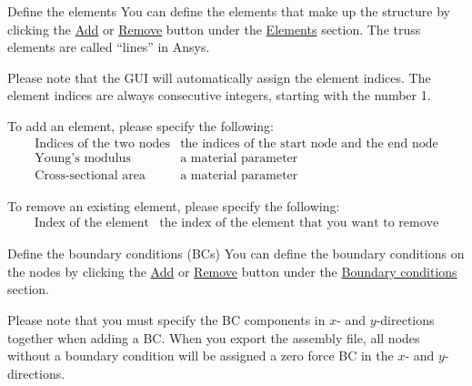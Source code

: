 \documentclass[oneside, english, reqno]{amsart}
\makeatletter
\theoremstyle{plain}
\theoremstyle{plain}
\theoremstyle{plain}
\theoremstyle{plain}
\theoremstyle{definition}
\theoremstyle{definition}
\theoremstyle{definition}
\def\subsection{\@startsection{subsection}{3}%
  \z@{2\linespacing}{.3\linespacing}%
  {\normalfont}}
\numberwithin{equation}{section}
\makeatother
\begin{document}
\subsection{Define the elements}
\label{sec:1.2}
You can define the elements that make up the structure by clicking the \underline{Add} or \underline{Remove} button under the \underline{Elements} section. The truss elements are called ``lines'' in Ansys.

Please note that the GUI will automatically assign the element indices. The element indices are always consecutive integers, starting with the number 1. \vspace{20pt}

To add an element, please specify the following:
\begin{equation*}
		\begin{array}{ll}
				\mbox{Indices of the two nodes} & \mbox{the indices of the start node and the end node} \\[6pt]
				\mbox{Young's modulus} & \mbox{a material parameter} \\[6pt]
				\mbox{Cross-sectional area} & \mbox{a material parameter}
		\end{array}
\end{equation*} \vspace{10pt}

To remove an existing element, please specify the following:
\begin{equation*}
		\begin{array}{ll}
				\mbox{Index of the element} & \mbox{the index of the element that you want to remove}
		\end{array}
\end{equation*}


\newpage
\subsection{Define the boundary conditions (BCs)}
\label{sec:1.3}
You can define the boundary conditions on the nodes by clicking the \underline{Add} or \underline{Remove} button under the \underline{Boundary conditions} section.

Please note that you must specify the BC components in \(x\)- and \(y\)-directions together when adding a BC. When you export the assembly file, all nodes without a boundary condition will be assigned a zero force BC in the \(x\)- and \(y\)-directions. \vspace{20pt}
\end{document}

